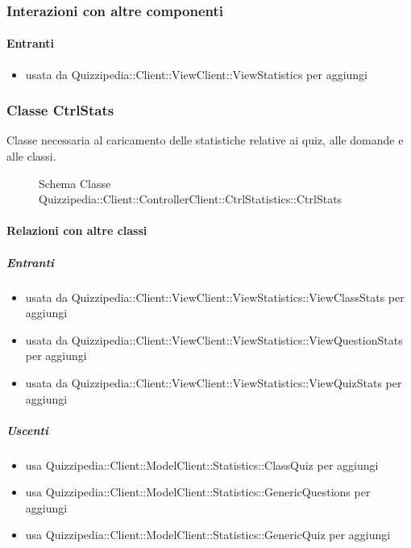\subsubsection{Interazioni con altre componenti}
\paragraph{Entranti}
\begin{itemize}
\item usata da Quizzipedia::Client::ViewClient::ViewStatistics per aggiungi
\end{itemize}
\subsubsection{Classe CtrlStats}
Classe necessaria al caricamento delle statistiche relative ai quiz, alle domande e alle classi.
\begin{figure}[H]
\centering
\noindent{}
\caption[Schema Classe CtrlStats]{Schema Classe Quizzipedia::Client::ControllerClient::CtrlStatistics::CtrlStats}
\end{figure}
\paragraph{Relazioni con altre classi}
\subparagraph{Entranti}
\begin{itemize}
\item usata da Quizzipedia::Client::ViewClient::ViewStatistics::ViewClassStats per aggiungi
\item usata da Quizzipedia::Client::ViewClient::ViewStatistics::ViewQuestionStats per aggiungi
\item usata da Quizzipedia::Client::ViewClient::ViewStatistics::ViewQuizStats per aggiungi
\end{itemize}
\subparagraph{Uscenti}
\begin{itemize}
\item usa Quizzipedia::Client::ModelClient::Statistics::ClassQuiz per aggiungi
\item usa Quizzipedia::Client::ModelClient::Statistics::GenericQuestions per aggiungi
\item usa Quizzipedia::Client::ModelClient::Statistics::GenericQuiz per aggiungi
\end{itemize}
